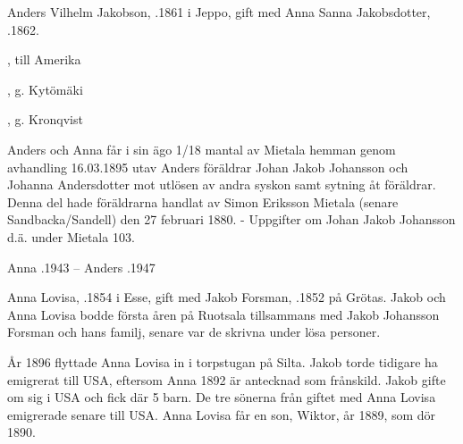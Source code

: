 Anders Vilhelm Jakobson, .1861 i Jeppo, gift med Anna Sanna Jakobsdotter, .1862.
\begin{jhchildren}
  \item {}, till Amerika
  \item {}
  \item {}
  \item {}
  \item {}
  \item {}
  \item {}
  \item {}, g. Kytömäki
  \item {}, g. Kronqvist
\end{jhchildren}
Anders och Anna får i sin ägo 1/18 mantal av Mietala hemman genom avhandling 16.03.1895 utav Anders föräldrar Johan Jakob Johansson och Johanna Andersdotter mot utlösen av andra syskon samt sytning åt föräldrar. Denna del hade föräldrarna handlat av Simon Eriksson Mietala (senare Sandbacka/Sandell) den 27 februari 1880. - Uppgifter om Johan Jakob Johansson d.ä. under Mietala 103.

Anna .1943  --  Anders .1947




Anna Lovisa, .1854 i Esse, gift med Jakob Forsman, .1852 på Grötas. Jakob och Anna Lovisa bodde första åren på Ruotsala tillsammans med Jakob Johansson Forsman och hans familj, senare var de skrivna under lösa personer.
\begin{jhchildren}
  \item {}
  \item {}
  \item {}
\end{jhchildren}
År 1896 flyttade Anna Lovisa in i torpstugan på Silta. Jakob torde tidigare ha emigrerat till USA, eftersom Anna 1892 		är antecknad som frånskild. Jakob gifte om sig i USA och fick där 5 barn. De tre sönerna från giftet med Anna Lovisa emigrerade senare till USA. Anna Lovisa får en son, Wiktor, år 1889, som dör 1890.

